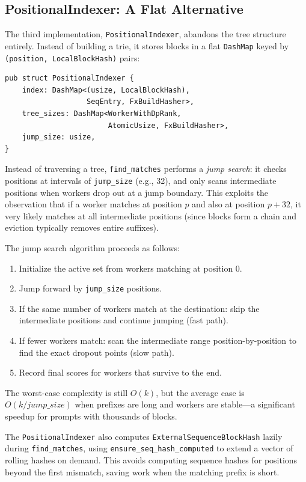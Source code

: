 \subsection{PositionalIndexer: A Flat Alternative}

The third implementation, \texttt{PositionalIndexer}, abandons the tree structure entirely. Instead of building a trie, it stores blocks in a flat \texttt{DashMap} keyed by \texttt{(position, LocalBlockHash)} pairs:

\begin{verbatim}
pub struct PositionalIndexer {
    index: DashMap<(usize, LocalBlockHash),
                   SeqEntry, FxBuildHasher>,
    tree_sizes: DashMap<WorkerWithDpRank,
                        AtomicUsize, FxBuildHasher>,
    jump_size: usize,
}
\end{verbatim}

Instead of traversing a tree, \texttt{find\_matches} performs a \emph{jump search}: it checks positions at intervals of \texttt{jump\_size} (e.g., 32), and only scans intermediate positions when workers drop out at a jump boundary. This exploits the observation that if a worker matches at position $p$ and also at position $p + 32$, it very likely matches at all intermediate positions (since blocks form a chain and eviction typically removes entire suffixes).

The jump search algorithm proceeds as follows:
\begin{enumerate}
  \item Initialize the active set from workers matching at position 0.
  \item Jump forward by \texttt{jump\_size} positions.
  \item If the same number of workers match at the destination: skip the intermediate positions and continue jumping (fast path).
  \item If fewer workers match: scan the intermediate range position-by-position to find the exact dropout points (slow path).
  \item Record final scores for workers that survive to the end.
\end{enumerate}

The worst-case complexity is still $O(k)$, but the average case is $O(k / \mathit{jump\_size})$ when prefixes are long and workers are stable---a significant speedup for prompts with thousands of blocks.

\begin{insightbox}
The \texttt{PositionalIndexer} also computes \texttt{ExternalSequenceBlockHash} lazily during \texttt{find\_matches}, using \texttt{ensure\_seq\_hash\_computed} to extend a vector of rolling hashes on demand. This avoids computing sequence hashes for positions beyond the first mismatch, saving work when the matching prefix is short.
\end{insightbox}

